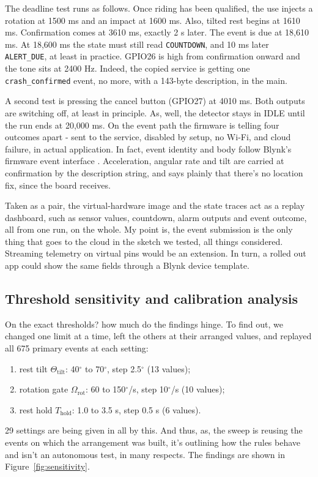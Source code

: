 \documentclass[10pt,a4paper]{article}
\newcommand{\degree}{\ensuremath{^{\circ}}}
\begin{document}
The deadline test runs as follows. Once riding has been qualified, the use injects a rotation at 1500 ms and an impact at 1600 ms. Also, tilted rest begins at 1610 ms. Confirmation comes at 3610 ms, exactly 2 s later. The event is due at 18,610 ms. At 18,600 ms the state must still read \texttt{COUNTDOWN}, and 10 ms later \texttt{ALERT\_DUE}, at least in practice. GPIO26 is high from confirmation onward and the tone sits at 2400 Hz. Indeed, the copied service is getting one \texttt{crash\_confirmed} event, no more, with a 143-byte description, in the main.

A second test is pressing the cancel button (GPIO27) at 4010 ms. Both outputs are switching off, at least in principle. As, well, the detector stays in IDLE until the run ends at 20,000 ms. On the event path the firmware is telling four outcomes apart - sent to the service, disabled by setup, no Wi-Fi, and cloud failure, in actual application. In fact, event identity and body follow Blynk's firmware event interface \cite{blynkevents}. Acceleration, angular rate and tilt are carried at confirmation by the description string, and says plainly that there's no location fix, since the board receives.

Taken as a pair, the virtual-hardware image and the state traces act as a replay dashboard, such as sensor values, countdown, alarm outputs and event outcome, all from one run, on the whole. My point is, the event submission is the only thing that goes to the cloud in the sketch we tested, all things considered. Streaming telemetry on virtual pins would be an extension. In turn, a rolled out app could show the same fields through a Blynk device template.

\subsection{Threshold sensitivity and calibration analysis}
On the exact thresholds?  how much do the findings hinge. To find out, we changed one limit at a time, left the others at their arranged values, and replayed all 675 primary events at each setting:
\begin{enumerate}
\item rest tilt $\Theta_{\mathrm{tilt}}$: 40$\degree$ to 70$\degree$, step 2.5$\degree$ (13 values);
\item rotation gate $\Omega_{\mathrm{rot}}$: 60 to 150$\degree$/s, step 10$\degree$/s (10 values);
\item rest hold $T_{\mathrm{hold}}$: 1.0 to 3.5 s, step 0.5 s (6 values).
\end{enumerate}
29 settings are being given in all by this. And thus, as, the sweep is reusing the events on which the arrangement was built, it's outlining how the rules behave and isn't an autonomous test, in many respects. The findings are shown in Figure~\ref{fig:sensitivity}.
\end{document}
